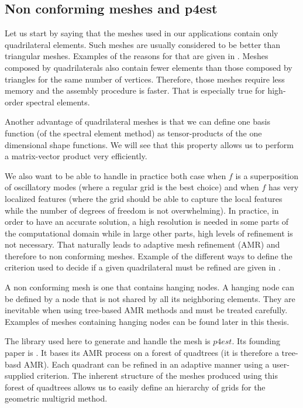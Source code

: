 \subsection*{Non conforming meshes and p4est}

Let us start by saying that the meshes used in our applications contain only quadrilateral elements. Such meshes are usually considered to be better than triangular meshes. Examples of the reasons for that are given in \cite{hexes}. Meshes composed by quadrilaterals also contain fewer elements than those composed by triangles for the same number of vertices. Therefore, those meshes require less memory and the assembly procedure is faster. That is especially true for high-order spectral elements.

Another advantage of quadrilateral meshes is that we can define one basis function (of the spectral element method) as tensor-products of the one dimensional shape functions. We will see that this property allows us to perform a matrix-vector product very efficiently.  

We also want to be able to handle in practice both case when $f$ is a superposition of oscillatory modes (where a regular grid is the best choice) and when $f$ has very localized features (where the grid should be able to capture the local features while the number of degrees of freedom is not overwhelming). In practice, in order to have an accurate solution, a high resolution is needed in some parts of the computational domain while in large other parts, high levels of refinement is not necessary.  That naturally leads to adaptive mesh refinement (AMR) and therefore to non conforming meshes. Example of the different ways to define the criterion used to decide if a given quadrilateral must be refined are given in \cite{refine}.

A non conforming mesh is one that contains hanging nodes. A hanging node can be defined by a node that is not shared by all its neighboring elements. They are inevitable when using tree-based AMR methods and must be treated carefully. Examples of meshes containing hanging nodes can be found later in this thesis. 

The library used here to generate and handle the mesh is $p4est$. Its founding paper is \cite{p4est}. It bases its AMR process on a forest of quadtrees (it is therefore a tree-basd AMR). Each quadrant can be refined in an adaptive manner using a user-supplied criterion. The inherent structure of the meshes produced using this forest of quadtrees allows us to easily define an hierarchy of grids for the geometric multigrid method.  


